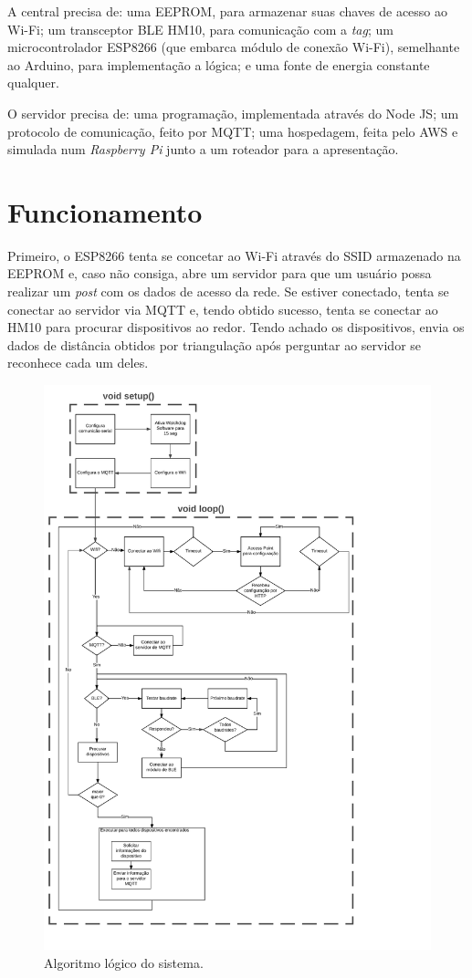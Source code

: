 \documentclass[
	12pt,				%
	openright,			%
	twoside,			%
	a4paper,			%
	english,			%
	french,				%
	spanish,			%
	brazil				%
	]{abntex2}
\begin{document}
A central precisa de: uma EEPROM, para armazenar suas chaves de acesso ao Wi-Fi; um transceptor BLE HM10, para comunicação com a \emph{tag}; um microcontrolador ESP8266 (que embarca módulo de conexão Wi-Fi), semelhante ao Arduino, para implementação a lógica; e uma fonte de energia constante qualquer.

O servidor precisa de: uma programação, implementada através do Node JS; um protocolo de comunicação, feito por MQTT; uma hospedagem, feita pelo AWS e simulada num \textit{Raspberry Pi} junto a um roteador para a apresentação.

\section{Funcionamento}

Primeiro, o ESP8266 tenta se concetar ao Wi-Fi através do SSID armazenado na EEPROM e, caso não consiga, abre um servidor para que um usuário possa realizar um \emph{post} com os dados de acesso da rede. Se estiver conectado, tenta se conectar ao servidor via MQTT e, tendo obtido sucesso, tenta se conectar ao HM10 para procurar dispositivos ao redor. Tendo achado os dispositivos, envia os dados de distância obtidos por triangulação após perguntar ao servidor se reconhece cada um deles.

\begin{figure}[t]
    \centering
    \includegraphics[width=\linewidth]{block_diagram}
    \caption{Algoritmo lógico do sistema.}
    \label{fig:blocos}
\end{figure}
\end{document}
